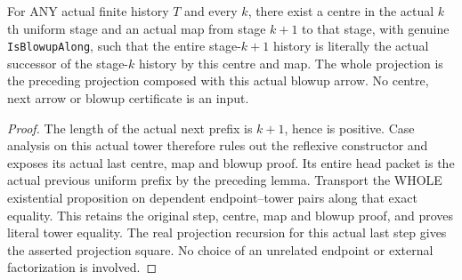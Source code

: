 \begin{theorem}
\label{hir:sharp-actual-curve-uniform-prefix-actual-next-blowup}
\leanok
For ANY actual finite history $T$ and every $k$, there exist a centre in the
actual $k$th uniform stage and an actual map from stage $k+1$ to that stage,
with genuine \texttt{IsBlowupAlong}, such that the entire stage-$k+1$ history
is literally the actual successor of the stage-$k$ history by this centre
and map. The whole projection is the preceding projection composed with
this actual blowup arrow. No centre, next arrow or blowup certificate is
an input.
\end{theorem}
\begin{proof}
The length of the actual next prefix is $k+1$, hence is positive. Case
analysis on this actual tower therefore rules out the reflexive constructor
and exposes its actual last centre, map and blowup proof. Its entire head
packet is the actual previous uniform prefix by the preceding lemma.
Transport the WHOLE existential proposition on dependent endpoint--tower
pairs along that exact equality. This retains the original step, centre,
map and blowup proof, and proves literal tower equality. The real projection
recursion for this actual last step gives the asserted projection square.
No choice of an unrelated endpoint or external factorization is involved.
\end{proof}

